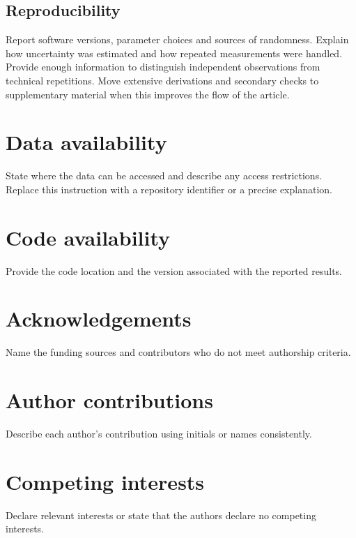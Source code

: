 \subsection{Reproducibility}
Report software versions, parameter choices and sources of randomness. Explain
how uncertainty was estimated and how repeated measurements were handled.
Provide enough information to distinguish independent observations from
technical repetitions. Move extensive derivations and secondary checks to
supplementary material when this improves the flow of the article.

\section{Data availability}
State where the data can be accessed and describe any access restrictions.
Replace this instruction with a repository identifier or a precise explanation.

\section{Code availability}
Provide the code location and the version associated with the reported results.

\section{Acknowledgements}
Name the funding sources and contributors who do not meet authorship criteria.

\section{Author contributions}
Describe each author's contribution using initials or names consistently.

\section{Competing interests}
Declare relevant interests or state that the authors declare no competing interests.
